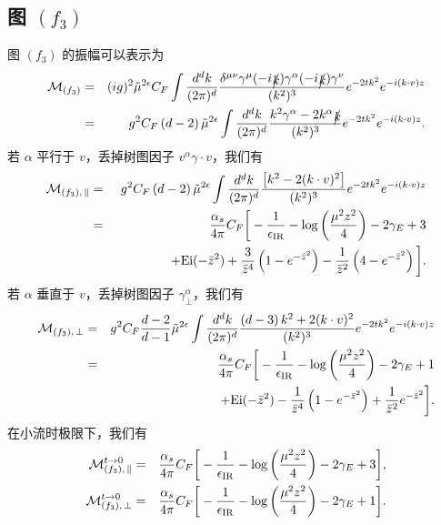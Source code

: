 \subsection{图 $(f_3)$}
图 $(f_3)$ 的振幅可以表示为
\begin{eqnarray}
\mathcal{M}_{(f_3)} &=&(ig)^2\tilde{\mu}^{2\epsilon} C_F \int \frac{d^d k}{(2\pi)^d} \frac{\delta^{\mu\nu}\gamma^\mu(-i\slashed{k})\gamma^\alpha(-i\slashed{k})\gamma^\nu}{(k^2)^3}e^{-2t k^2}e^{-i(k\cdot v)z}\nonumber\\
&=& g^2C_F \left(d-2\right)\tilde{\mu}^{2\epsilon} \int \frac{d^d k}{(2\pi)^d} \frac{k^2\gamma^\alpha -2k^\alpha\slashed{k}}{(k^2)^3}e^{-2t k^2}e^{-i(k\cdot v)z}.
\end{eqnarray}
若 $\alpha$ 平行于 $v$，丢掉树图因子 $v^{\alpha}\gamma\cdot v$，我们有
\begin{eqnarray}
\label{eq:resultsdiagrama0}
\mathcal{M}_{(f_3),\, \|}
&=& g^2C_F \left(d-2\right)\tilde{\mu}^{2\epsilon}  \int \frac{d^d k}{(2\pi)^d} \frac{\left[k^2-2(k\cdot v)^2\right]}{(k^2)^3}e^{-2t k^2}e^{-i(k\cdot v)z}\nonumber\\
&=&\frac{\alpha_s}{4\pi}C_F\bigg[-\frac{1}{\epsilon_{\rm IR}} - \log\left(\frac{\mu^2z^2}{4}\right) -2\gamma_E +3 \nonumber\\
&&\, \, \, \, \, \, \,\, \, \, \, \, \, \, \, \, \, \, \, \, \, \,  \, \, \, \,  +\text{Ei}(-\bar{z}^2) +\frac{3}{\bar{z}^4}\left(1-e^{-\bar{z}^2}\right) - \frac{1}{\bar{z}^2}\left(4-e^{-\bar{z}^2}\right)\bigg].
\end{eqnarray}
若 $\alpha$ 垂直于 $v$，丢掉树图因子 $\gamma^{\alpha}_{\perp}$，我们有
\begin{eqnarray}
\label{eq:resultsdiagramaalpha}
\mathcal{M}_{(f_3),\, \perp}&=& g^2C_F \frac{d-2}{d-1}\tilde{\mu}^{2\epsilon}  \int \frac{d^d k}{(2\pi)^d} \frac{\left(d-3\right)k^2+2(k\cdot v)^2}{(k^2)^3}e^{-2t k^2}e^{-i(k\cdot v)z}\nonumber\\
&=&\frac{\alpha_s}{4\pi}C_F\bigg[-\frac{1}{\epsilon_{\rm IR}} - \log\left(\frac{\mu^2z^2}{4}\right) -2\gamma_E +1 \nonumber\\
&&\, \, \, \, \, \, \,\, \, \, \, \, \, \, \, \, \, \, \, \, \, \, \,  \, \, \, \,  +\text{Ei}(-\bar{z}^2) - \frac{1}{\bar{z}^4}\left(1-e^{-\bar{z}^2}\right) + \frac{1}{\bar{z}^2}
e^{-\bar{z}^2}\bigg].
\end{eqnarray}
在小流时极限下，我们有
\begin{eqnarray}
\mathcal{M}_{(f_3),\, \|}^{t\rightarrow 0} &= &\frac{\alpha_s}{4\pi}C_F\bigg[-\frac{1}{\epsilon_{\rm IR}} - \log\left(\frac{\mu^2z^2}{4}\right) -2\gamma_E +3 \bigg],\\
\mathcal{M}_{(f_3),\, \perp}^{t\rightarrow 0} &= &\frac{\alpha_s}{4\pi}C_F\bigg[-\frac{1}{\epsilon_{\rm IR}} - \log\left(\frac{\mu^2z^2}{4}\right) -2\gamma_E +1 \bigg].
\end{eqnarray}
